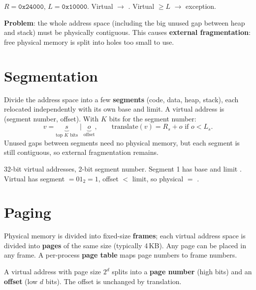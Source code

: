 \begin{example}
$R = \mathtt{0x24000}$, $L = \mathtt{0x10000}$. Virtual  $\to$ .
Virtual  $\ge L$ $\to$ exception.
\end{example}

\textbf{Problem}: the whole address space (including the big unused gap between heap and stack)
must be physically contiguous. This causes \textbf{external fragmentation}: free physical memory
is split into holes too small to use.

\section{Segmentation}

Divide the address space into a few \textbf{segments} (code, data, heap, stack), each relocated
independently with its own base and limit. A virtual address is (segment number, offset).
With $K$ bits for the segment number:
\[
  v = \underbrace{s}_{\text{top }K\text{ bits}} \mid \underbrace{o}_{\text{offset}}, \qquad
  \text{translate}(v) = R_s + o \text{ if } o < L_s.
\]
Unused gaps between segments need no physical memory, but each segment is still contiguous,
so external fragmentation remains.

\begin{example}
32-bit virtual addresses, 2-bit segment number. Segment 1 has base  and limit
. Virtual  has segment $= 01_2 = 1$, offset  $<$ limit,
so physical $=$ .
\end{example}

\section{Paging}

\begin{definition}[Paging]
Physical memory is divided into fixed-size \textbf{frames}; each virtual address space is
divided into \textbf{pages} of the same size (typically 4\,KB). Any page can be placed in any
frame. A per-process \textbf{page table} maps page numbers to frame numbers.
\end{definition}

A virtual address with page size $2^{d}$ splits into a \textbf{page number} (high bits) and an
\textbf{offset} (low $d$ bits). The offset is unchanged by translation.

